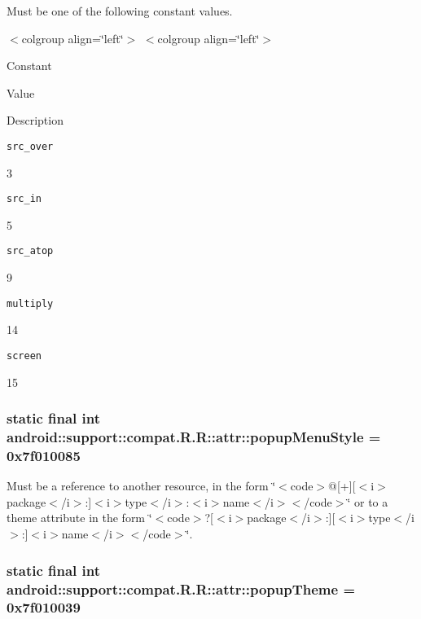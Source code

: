 Must be one of the following constant values. \begin{TabularC}{0}
\hline
\end{TabularC}
$<$colgroup align=\char`\"{}left\char`\"{}$>$ $<$colgroup align=\char`\"{}left\char`\"{}$>$ 

Constant

Value

Description 

{\tt src\_\-over}

3

{\tt src\_\-in}

5

{\tt src\_\-atop}

9

{\tt multiply}

14

{\tt screen}

15\hypertarget{classandroid_1_1support_1_1compat_1_1_r_1_1attr_ff427be8de532fe124910dd62e830306}{
\subsubsection[{popupMenuStyle}]{\setlength{\rightskip}{0pt plus 5cm}static final int android::support::compat.R.R::attr::popupMenuStyle = 0x7f010085}}
\label{classandroid_1_1support_1_1compat_1_1_r_1_1attr_ff427be8de532fe124910dd62e830306}


Must be a reference to another resource, in the form \char`\"{}$<$code$>$@\mbox{[}+\mbox{]}\mbox{[}$<$i$>$package$<$/i$>$:\mbox{]}$<$i$>$type$<$/i$>$:$<$i$>$name$<$/i$>$$<$/code$>$\char`\"{} or to a theme attribute in the form \char`\"{}$<$code$>$?\mbox{[}$<$i$>$package$<$/i$>$:\mbox{]}\mbox{[}$<$i$>$type$<$/i$>$:\mbox{]}$<$i$>$name$<$/i$>$$<$/code$>$\char`\"{}. \hypertarget{classandroid_1_1support_1_1compat_1_1_r_1_1attr_1578013042e3f57340481c2939370b4e}{
\subsubsection[{popupTheme}]{\setlength{\rightskip}{0pt plus 5cm}static final int android::support::compat.R.R::attr::popupTheme = 0x7f010039}}
\label{classandroid_1_1support_1_1compat_1_1_r_1_1attr_1578013042e3f57340481c2939370b4e}


